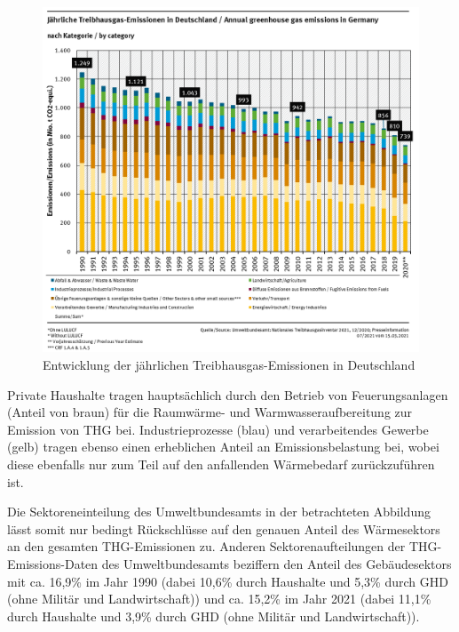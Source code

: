 			\begin{figure}[h!]
				\includegraphics[width=0.7\linewidth]{Medien/own/Umweltbundesamt_Treibhausgasemissionen_Sektoren_1990_bis_2019.png}
				\caption{Entwicklung der jährlichen Treibhausgas-Emissionen in Deutschland\cite{Umweltbundesamt_Treibhausgasemissionen_Deutschland_seit_1990}}
				\label{fig:UBA_Entwicklung_THG_Emissionen_1990_2019}
			\end{figure}
			
			Private Haushalte tragen hauptsächlich durch den Betrieb von Feuerungsanlagen (Anteil von braun) für die Raumwärme- und Warmwasseraufbereitung zur Emission von THG bei.			
			Industrieprozesse (blau) und verarbeitendes Gewerbe (gelb) tragen ebenso einen erheblichen Anteil an Emissionsbelastung bei, wobei diese ebenfalls nur zum Teil auf den anfallenden Wärmebedarf zurückzuführen ist. \cite{Umweltbundesamt_Treibhausgasemissionen_Deutschland_seit_1990}
			
			Die Sektoreneinteilung des Umweltbundesamts in der betrachteten Abbildung lässt somit nur bedingt Rückschlüsse auf den genauen Anteil des Wärmesektors an den gesamten THG-Emissionen zu. Anderen Sektorenaufteilungen der THG-Emissions-Daten des Umweltbundesamts beziffern den Anteil des Gebäudesektors mit ca. 16,9\% im Jahr 1990 (dabei 10,6\% durch Haushalte und 5,3\% durch GHD (ohne Militär und Landwirtschaft)) und ca. 15,2\% im Jahr 2021 (dabei 11,1\% durch Haushalte und 3,9\% durch GHD (ohne Militär und Landwirtschaft)).\cite{Umweltbundesamt_Treibhausgasemissionen_Deutschland}
			
			

